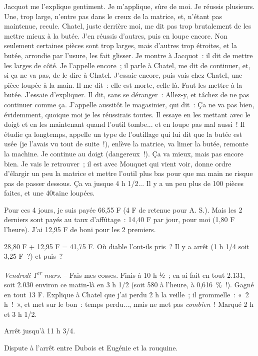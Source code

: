 \documentclass[french,twoside]{book} %
\begin{document}
Jacquot me l'explique gentiment. Je m'applique, sûre de moi. Je réussis plusieurs. Une, trop large, n'entre pas dans le creux de la matrice, et, n'étant pas maintenue, recule. Chatel, juste derrière moi, me dit pas trop brutalement de les mettre mieux à la butée. J'en réussis d'autres, puis en loupe encore. Non seulement certaines pièces sont trop larges, mais d'autres trop étroites, et la butée, arrondie par l'usure, les fait glisser. Je montre à Jacquot : il dit de mettre les larges de côté. Je l'appelle encore ; il parle à Chatel, me dit de continuer, et, si ça ne va pas, de le dire à Chatel. J'essaie encore, puis vais chez Chatel, une pièce loupée à la main. Il me dit : elle est morte, celle-là. Faut les mettre à la butée. J'essaie d'expliquer. Il dit, sans se déranger : Allez-y, et tâchez de ne pas continuer comme ça. J'appelle aussitôt le magasinier, qui dit : Ça ne va pas bien, évidemment, quoique moi je les réussirais toutes. Il essaye en les mettant avec le doigt et en les maintenant quand l'outil tombe... et en loupe pas mal aussi ! Il étudie ça longtemps, appelle un type de l'outillage qui lui dit que la butée est usée (je l'avais vu tout de suite !), enlève la matrice, va limer la butée, remonte la machine. Je continue au doigt (dangereux !). Ça va mieux, mais pas encore bien. Je vais le retrouver ; il est avec Mouquet qui vient voir, donne ordre d'élargir un peu la matrice et mettre l'outil plus bas pour que ma main ne risque pas de passer dessous. Ça va jusque 4 h 1/2... Il y a un peu plus de 100 pièces faites, et une 40taine loupées.\par
Pour ces 4 jours, je suis payée 66,55 F (4 F de retenue pour A. S.). Mais les 2 derniers sont payés au taux d'affûtage : 14,40 F par jour, pour moi (1,80 F l'heure). J'ai 12,95 F de boni pour les 2 premiers.\par
28,80 F + 12,95 F = 41,75 F. Où diable l'ont-ils pris ? Il y a arrêt (1 h 1/4 soit 3,25 F ?) et puis ?\par
{\itshape Vendredi 1\textsuperscript{er} mars}. – Fais mes cosses. Finis à 10 h ½ ; en ai fait en tout 2.131, soit 2.030 environ ce matin-là en 3 h 1/2 (soit 580 à l'heure, à 0,616 \% !). Gagné en tout 13 F. Explique à Chatel que j'ai perdu 2 h la veille ; il grommelle : « 2 h ! », et met sur le bon : temps perdu..., mais ne met pas {\itshape combien} ! Marqué 2 h et 3 h 1/2.\par
Arrêt jusqu'à 11 h 3/4.\par
Dispute à l'arrêt entre Dubois et Eugénie et la rouquine.\par
\end{document}
